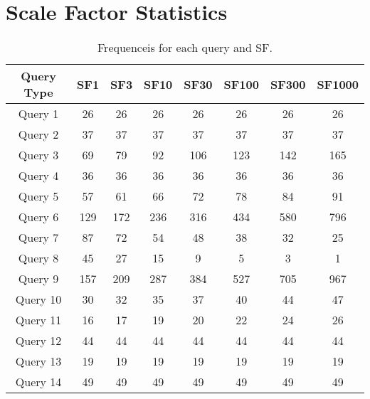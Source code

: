 \section{Scale Factor Statistics}\label{appendix:scale_factors}

\begin{table}[H]
\centering
\begin{tabular}{|c|c|c|c|c|c|c|c|}
    \hline
    \textbf{Query Type} & \textbf{SF1} & \textbf{SF3}& \textbf{SF10} & \textbf{SF30} & \textbf{SF100} & \textbf{SF300} & \textbf{SF1000} \\ 
    \hline
    \hline
    Query 1 & 26  & 26  & 26  & 26  & 26  & 26  & 26 \\ 
    \hline                                           
    Query 2 & 37  & 37  & 37  & 37  & 37  & 37  & 37 \\  
    \hline                                           
    Query 3 & 69  & 79  & 92  & 106 & 123 & 142 & 165\\ 
    \hline                                           
    Query 4 & 36  & 36  & 36  & 36  & 36  & 36  & 36 \\ 
    \hline                                           
    Query 5 & 57  & 61  & 66  & 72  & 78  & 84  & 91 \\ 
    \hline                                           
    Query 6 & 129 & 172 & 236 & 316 & 434 & 580 & 796\\  
    \hline                                           
    Query 7 & 87 & 72   & 54  & 48  & 38  & 32  & 25 \\ 
    \hline
    Query 8 & 45 &  27  & 15  & 9   & 5   & 3   & 1  \\ 
    \hline                                           
    Query 9 & 157 & 209 & 287 & 384 & 527 & 705 & 967\\  
    \hline                                           
    Query 10 & 30 & 32  & 35  & 37  & 40  & 44  & 47 \\ 
    \hline                                           
    Query 11 & 16 & 17  & 19  & 20  & 22  & 24  & 26 \\ 
    \hline                                           
    Query 12 & 44 & 44  & 44  & 44  & 44  & 44  & 44 \\ 
    \hline                                           
    Query 13 & 19 & 19  & 19  & 19  & 19  & 19  & 19 \\  
    \hline                                           
    Query 14 & 49 & 49  & 49  & 49  & 49  & 49  & 49 \\ 
    \hline
    \end{tabular}
    \caption{Frequenceis for each query and SF.}
    \label{table:freqs_sf1}
\end{table}

